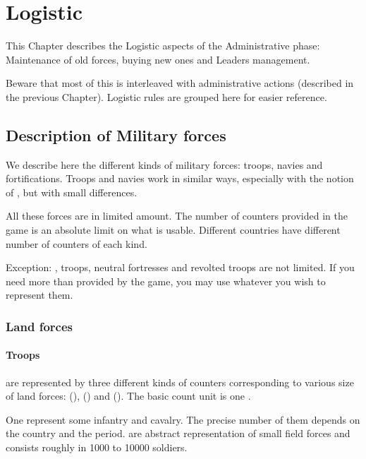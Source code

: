 
\chapter{Logistic}\label{chapter:Logistic}
\begin{designnote}
  This Chapter describes the Logistic aspects of the Administrative phase:
  Maintenance of old forces, buying new ones and Leaders management.

  Beware that most of this is interleaved with administrative actions
  (described in the previous Chapter). Logistic rules are grouped here for
  easier reference.
\end{designnote}

\section{Description of Military forces}

We describe here the different kinds of military forces: troops, navies and
fortifications. Troops and navies work in similar ways, especially with the
notion of , but with small differences.

All these forces are in limited amount. The number of counters provided in the
game is an absolute limit on what is usable. Different countries have
different number of counters of each kind.

Exception:  \corsaire,  troops, neutral fortresses
and revolted troops are not limited. If you need more than provided by the
game, you may use whatever you wish to represent them.



\subsection{Land forces}


\subsubsection{Troops}\label{chLogistic:Troops definition}
\aparag[Troops] are represented by three different kinds of counters
corresponding to various size of land forces:  (\ARMY),
 (\LD) and 
(\LDE).
\bparag The basic count unit is one \LD.

\aparag[Detachments.] One \LD represent some infantry and cavalry. The precise
number of them depends on the country and the period. \LD are abstract
representation of small field forces and consists roughly in 1000 to 10000
soldiers.

